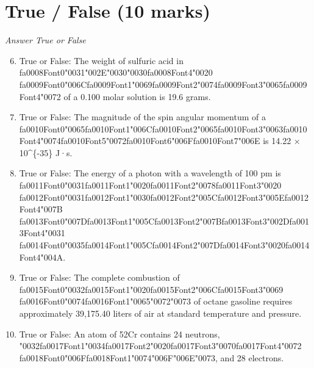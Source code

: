 \documentclass[12pt]{article}
\begin{document}
\section*{True / False (10 marks)}
\textit{Answer True or False}
\begin{enumerate}[label=\arabic*.]
\setcounter{enumi}{5}
\item True or False: The weight of sulfuric acid in {\csname fa0008Font0\endcsname\char"0031}{\char"002E}{\char"0030}{\char"0030}{\csname fa0008Font4\endcsname\char"0020} {\csname fa0009Font0\endcsname\char"006C}{\csname fa0009Font1\endcsname\char"0069}{\csname fa0009Font2\endcsname\char"0074}{\csname fa0009Font3\endcsname\char"0065}{\csname fa0009Font4\endcsname\char"0072} of a 0.100 molar solution is 19.6 grams.
\item True or False: The magnitude of the spin angular momentum of a {\csname fa0010Font0\endcsname\char"0065}{\csname fa0010Font1\endcsname\char"006C}{\csname fa0010Font2\endcsname\char"0065}{\csname fa0010Font3\endcsname\char"0063}{\csname fa0010Font4\endcsname\char"0074}{\csname fa0010Font5\endcsname\char"0072}{\csname fa0010Font6\endcsname\char"006F}{\csname fa0010Font7\endcsname\char"006E} is 14.22 × 10\^{}\{-35\} J·s.
\item True or False: The energy of a photon with a wavelength of 100 pm is {\csname fa0011Font0\endcsname\char"0031}{\csname fa0011Font1\endcsname\char"0020}{\csname fa0011Font2\endcsname\char"0078}{\csname fa0011Font3\endcsname\char"0020} {\csname fa0012Font0\endcsname\char"0031}{\csname fa0012Font1\endcsname\char"0030}{\csname fa0012Font2\endcsname\char"005C}{\csname fa0012Font3\endcsname\char"005E}{\csname fa0012Font4\endcsname\char"007B} {\csname fa0013Font0\endcsname\char"007D}{\csname fa0013Font1\endcsname\char"005C}{\csname fa0013Font2\endcsname\char"007B}{\csname fa0013Font3\endcsname\char"002D}{\csname fa0013Font4\endcsname\char"0031} {\csname fa0014Font0\endcsname\char"0035}{\csname fa0014Font1\endcsname\char"005C}{\csname fa0014Font2\endcsname\char"007D}{\csname fa0014Font3\endcsname\char"0020}{\csname fa0014Font4\endcsname\char"004A}.
\item True or False: The complete combustion of {\csname fa0015Font0\endcsname\char"0032}{\csname fa0015Font1\endcsname\char"0020}{\csname fa0015Font2\endcsname\char"006C}{\csname fa0015Font3\endcsname\char"0069} {\csname fa0016Font0\endcsname\char"0074}{\csname fa0016Font1\endcsname\char"0065}{\char"0072}{\char"0073} of octane gasoline requires approximately 39,175.40 liters of air at standard temperature and pressure.
\item True or False: An atom of 52Cr contains 24 neutrons, {\char"0032}{\csname fa0017Font1\endcsname\char"0034}{\csname fa0017Font2\endcsname\char"0020}{\csname fa0017Font3\endcsname\char"0070}{\csname fa0017Font4\endcsname\char"0072} {\csname fa0018Font0\endcsname\char"006F}{\csname fa0018Font1\endcsname\char"0074}{\char"006F}{\char"006E}{\char"0073}, and 28 electrons.
\end{enumerate}
\end{document}
